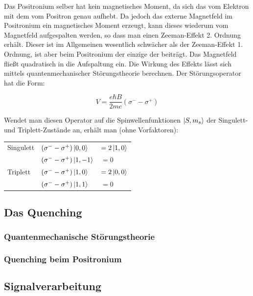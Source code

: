 Das Positronium selber hat kein magnetisches Moment, da sich das vom Elektron mit dem vom Positron genau aufhebt. Da jedoch das externe Magnetfeld im Positronium ein magnetisches Moment erzeugt, kann dieses wiederum vom Magnetfeld aufgespalten werden, so dass man einen Zeeman-Effekt 2. Ordnung erhält. Dieser ist im Allgemeinen wesentlich schwächer als der Zeeman-Effekt 1. Ordnung, ist aber beim Positronium der einzige der beiträgt. Das Magnetfeld fließt quadratisch in die Aufspaltung ein. Die Wirkung des Effekts lässt sich mittels quantenmechanischer Störungstheorie berechnen. Der Störungsoperator hat die Form:

\begin{equation} V=\frac{e\hbar B}{2mc}(\sigma^- - \sigma^+) \end{equation} 

Wendet man diesen Operator auf die Spinwellenfunktionen $\ket{S,m_s}$ der Singulett- und Triplett-Zustände an, erhält man (ohne Vorfaktoren):\\

\begin{tabular}[H]{l l l}
Singulett 	& $(\sigma^- - \sigma^+)\ket{0,0}$ &$ = 2\ket{1,0}$\\
		& $(\sigma^- - \sigma^+)\ket{1,-1}$ & $ = 0$\\
Triplett 	& $(\sigma^- - \sigma^+)\ket{1,0}$ &$ = 2\ket{0,0}$\\
		& $(\sigma^- - \sigma^+)\ket{1,1}$ &$ = 0$\\
\end{tabular}




\subsection{Das Quenching}
\subsubsection{Quantenmechanische Störungstheorie}
\subsubsection{Quenching beim Positronium}

\subsection{Signalverarbeitung}























